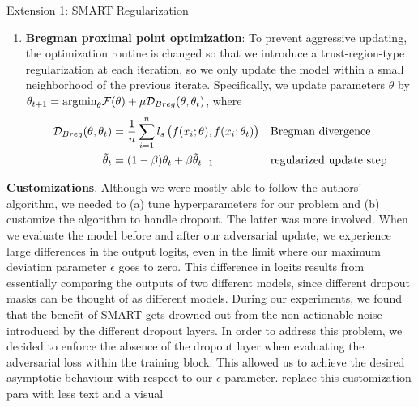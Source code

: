 \documentclass[final]{beamer}
\newlength{\colwidth}
\begin{document}
\begin{frame}[t]
\begin{columns}[t]
\begin{column}{\colwidth}
\begin{block}{Extension 1: SMART Regularization}
\begin{enumerate}
    \item \textbf{Bregman proximal point optimization}: To prevent aggressive updating, the optimization routine is changed so that we introduce a trust-region-type regularization at each iteration, so we only update the model within a small neighborhood of the previous iterate. Specifically, we update parameters $\theta$ by $\theta_{t+1} = \text{argmin}_{\theta} \mathcal{F}(\theta) + \mu \mathcal{D}_{Breg}(\theta, \Tilde{\theta_{t}})$, where
    \begin{align*}
    \mathcal{D}_{Breg}(\theta, \Tilde{\theta_{t}}) & = \frac{1}{n} \sum_{i=1}^{n} l_{s} \left( f(x_{i}; \theta), f(x_{i}; \Tilde{\theta_{t}}) \right) && \text{Bregman divergence} \\
    \Tilde{\theta}_{t} & = (1 - \beta)\theta_{t} + \beta \Tilde{\theta}_{t-1} && \text{regularized update step}
    \end{align*}
\end{enumerate}

\textbf{Customizations}. Although we were mostly able to follow the authors' algorithm, we needed to (a) tune hyperparameters for our problem and (b) customize the algorithm to handle dropout. The latter was more involved. When we evaluate the model before and after our adversarial update, we experience large differences in the output logits, even in the limit where our maximum deviation parameter $\epsilon$ goes to zero. This difference in logits results from essentially comparing the outputs of two different models, since different dropout masks can be thought of as different models. During our experiments, we found that the benefit of SMART gets drowned out from the non-actionable noise introduced by the different dropout layers. In order to address this problem, we decided to enforce the absence of the dropout layer when evaluating the adversarial loss within the training block. This allowed us to achieve the desired asymptotic behaviour with respect to our $\epsilon$ parameter. {\color{red} replace this customization para with less text and a visual}


\end{block}
\end{column}
\end{columns}
\end{frame}
\end{document}
